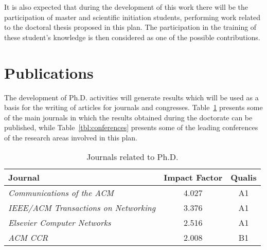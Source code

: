 	It is also expected that during the development of this work there will be the participation of master and scientific initiation students, performing work related to the doctoral thesis proposed in this plan. The participation in the training of these student's knowledge is then considered as one of the possible contributions.

	\section{Publications}
	\label{sec:publications}

	The development of Ph.D. activities will generate results which will be used as a basis for the writing of articles for journals and congresses. Table~\ref{tbl:journals} presents some of the main journals in which the results obtained during the doctorate can be published, while Table~\ref{tbl:conferences} presents some of the leading conferences of the research areas involved in this plan.


	\begin{table}[htp]
	\centering
	\begin{tabularx}{\textwidth}{l | c | c}
	\hline
	{\bf Journal}                                           & {\bf Impact Factor} & \textbf{Qualis} \\ \hline
    \textit{Communications of the ACM}                        &      4.027        & A1 \\ \hline
	\textit{IEEE/ACM Transactions on Networking}              &      3.376        & A1 \\ \hline
	\textit{Elsevier Computer Networks}                       &      2.516        & A1 \\ \hline
	\textit{ACM CCR}                					      &      2.008        & B1 \\ \hline
	

	\end{tabularx}
	\caption{Journals related to Ph.D.}
	\label{tbl:journals}
	\end{table}

